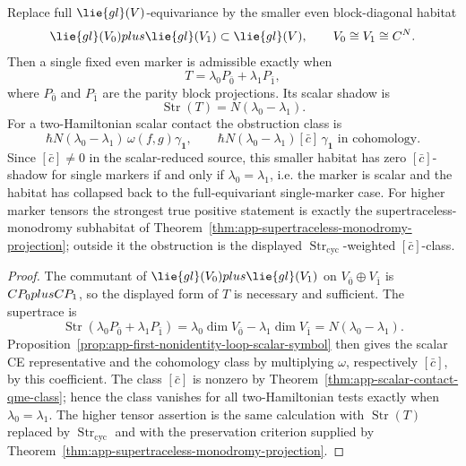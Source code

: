 \begin{prop}
\label{prop:app-even-block-marker-obstruction}
  Replace full \(\lie{gl}(V)\)-equivariance by the smaller even
  block-diagonal habitat
  \[
    \lie{gl}(V_{\bar0})\oplus\lie{gl}(V_{\bar1})
      \subset \lie{gl}(V),
    \qquad
    V_{\bar0}\cong V_{\bar1}\cong\C^N .
  \]
  Then a single fixed even marker is admissible exactly when
  \[
    T=\lambda_0P_{\bar0}+\lambda_1P_{\bar1},
  \]
  where \(P_{\bar0}\) and \(P_{\bar1}\) are the parity block
  projections.  Its scalar shadow is
  \[
    \operatorname{Str}(T)=N(\lambda_0-\lambda_1).
  \]
  For a two-Hamiltonian scalar contact the obstruction class is
  \[
    \hbar N(\lambda_0-\lambda_1)\,
    \omega(f,g)\gamma_{\mathbf 1},
    \qquad
    \hbar N(\lambda_0-\lambda_1)[\bar c]\,\gamma_{\mathbf 1}
    \text{ in cohomology}.
  \]
  Since \([\bar c]\neq0\) in the scalar-reduced source, this smaller
  habitat has zero \([\bar c]\)-shadow for single markers if and only if
  \(\lambda_0=\lambda_1\), i.e. the marker is scalar and the habitat
  has collapsed back to the full-equivariant single-marker case.  For
  higher marker tensors the strongest true positive statement is exactly
  the supertraceless-monodromy subhabitat of
  Theorem~\ref{thm:app-supertraceless-monodromy-projection}; outside it
  the obstruction is the displayed
  \(\operatorname{Str}_{\mathrm{cyc}}\)-weighted \([\bar c]\)-class.
\end{prop}

\begin{proof}
  The commutant of
  \(\lie{gl}(V_{\bar0})\oplus\lie{gl}(V_{\bar1})\) on
  \(V_{\bar0}\oplus V_{\bar1}\) is
  \(C P_{0}plusC P_{1}\), so the displayed form of \(T\) is
  necessary and sufficient.  The supertrace is
  \[
    \operatorname{Str}(\lambda_0P_{\bar0}+\lambda_1P_{\bar1})
      =
    \lambda_0\dim V_{\bar0}-\lambda_1\dim V_{\bar1}
      =
    N(\lambda_0-\lambda_1).
  \]
  Proposition~\ref{prop:app-first-nonidentity-loop-scalar-symbol} then
  gives the scalar CE representative and the cohomology class by
  multiplying \(\omega\), respectively \([\bar c]\), by this coefficient.
  The class \([\bar c]\) is nonzero by
  Theorem~\ref{thm:app-scalar-contact-qme-class}; hence the class
  vanishes for all two-Hamiltonian tests exactly when
  \(\lambda_0=\lambda_1\).  The higher tensor assertion is the same
  calculation with
  \(\operatorname{Str}(T)\) replaced by
  \(\operatorname{Str}_{\mathrm{cyc}}\) and with the preservation
  criterion supplied by
  Theorem~\ref{thm:app-supertraceless-monodromy-projection}.
\end{proof}

